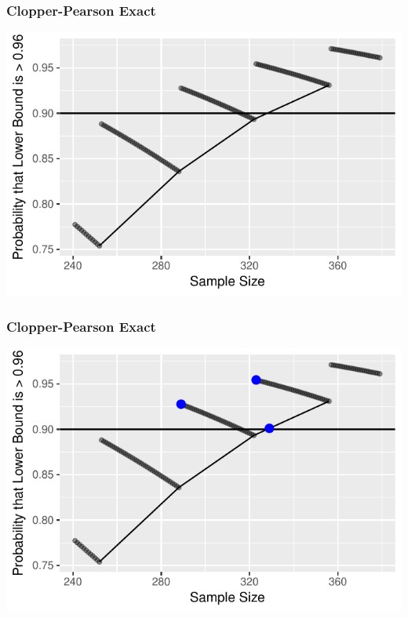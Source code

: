 \documentclass{beamer}\usepackage{knitr}
\begin{document}
\begin{frame}
\frametitle{Clopper-Pearson Exact}
\begin{knitrout}
\color{fgcolor}

{\centering \includegraphics[width=\linewidth]{figure/plot_Exact_3-1} 

}



\end{knitrout}
\end{frame}

\begin{frame}
\frametitle{Clopper-Pearson Exact}
\begin{knitrout}
\color{fgcolor}

{\centering \includegraphics[width=\linewidth]{figure/plot_Exact_4-1} 

}



\end{knitrout}
\end{frame}
\end{document}
